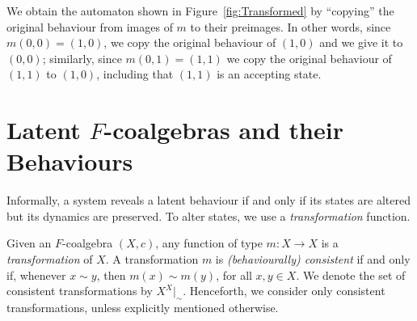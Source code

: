 We obtain the automaton shown in Figure~\ref{fig:Transformed} by ``copying'' the original behaviour from images of $m$ to their preimages. 
In other words, since $m(0,0)=(1,0)$, we copy the original behaviour of $(1,0)$ and we give it to $(0,0)$; similarly, since $m(0,1)=(1,1)$ we copy the original behaviour of $(1,1)$ to $(1,0)$, including that $(1,1)$ is an accepting state. 

\section{Latent $F$-coalgebras and their Behaviours}
Informally, a system reveals a latent behaviour if and only if its states are altered but its dynamics are preserved. To alter states, we use a \emph{transformation} function.

\begin{definition}
Given an $F$-coalgebra $(X,c)$, any function of type $m\colon X\rightarrow X$ is a \emph{transformation} of $X$. %
A transformation $m$ is \emph{(behaviourally) consistent} if and only if, whenever $x\sim y$, then $m(x)\sim m(y)$, for all $x,y \in X$. We denote the set of consistent transformations by $X^X|_\sim$. Henceforth, we consider only consistent transformations, unless explicitly mentioned otherwise.
\end{definition}


